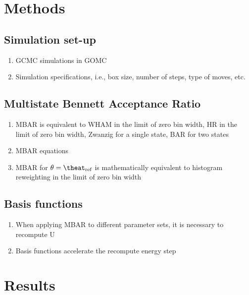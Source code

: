 \documentclass[11pt,a4paper]{article}
\begin{document}
\section{Methods}

\subsection{Simulation set-up}

\begin{enumerate}
	\item GCMC simulations in GOMC
	\item Simulation specifications, i.e., box size, number of steps, type of moves, etc.
\end{enumerate}

\subsection{Multistate Bennett Acceptance Ratio}

\begin{enumerate}
	\item MBAR is equivalent to WHAM in the limit of zero bin width, HR in the limit of zero bin width, Zwanzig for a single state, BAR for two states
	\item MBAR equations
	\item MBAR for $\theta = \theat_{\rm ref}$ is mathematically equivalent to histogram reweighting in the limit of zero bin width
\end{enumerate}

\subsection{Basis functions}

\begin{enumerate}
	\item When applying MBAR to different parameter sets, it is necessary to recompute U
	\item Basis functions accelerate the recompute energy step
\end{enumerate}

\section{Results}
\end{document}
